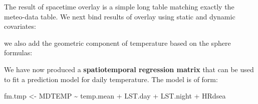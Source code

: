 \documentclass[
  graybox,natbib,nospthms]{svmono}
\newenvironment{Shaded}{\begin{snugshade}}{\end{snugshade}}
\newcommand{\AttributeTok}[1]{\textcolor[rgb]{0.61,0.61,0.61}{#1}}
\newcommand{\CommentTok}[1]{\textcolor[rgb]{0.37,0.37,0.37}{\textit{#1}}}
\newcommand{\FloatTok}[1]{\textcolor[rgb]{0.06,0.06,0.06}{#1}}
\newcommand{\FunctionTok}[1]{\textcolor[rgb]{0,0,0}{#1}}
\newcommand{\NormalTok}[1]{#1}
\newcommand{\OtherTok}[1]{\textcolor[rgb]{0.37,0.37,0.37}{#1}}
\newcommand{\SpecialCharTok}[1]{\textcolor[rgb]{0,0,0}{#1}}
\newcommand{\StringTok}[1]{\textcolor[rgb]{0.5,0.5,0.5}{#1}}
\begin{document}
The result of spacetime overlay is a simple long table matching exactly the meteo-data table.
We next bind results of overlay using static and dynamic covariates:

\begin{Shaded}
\end{Shaded}

we also add the geometric component of temperature based on the sphere formulas:

\begin{Shaded}
\end{Shaded}

We have now produced a \textbf{spatiotemporal regression matrix} that can be used to fit
a prediction model for daily temperature. The model is of form:

\begin{Shaded}
\begin{Highlighting}[]
\NormalTok{fm.tmp }\OtherTok{\textless{}{-}}\NormalTok{ MDTEMP }\SpecialCharTok{\textasciitilde{}}\NormalTok{ temp.mean }\SpecialCharTok{+}\NormalTok{ LST.day }\SpecialCharTok{+}\NormalTok{ LST.night }\SpecialCharTok{+}\NormalTok{ HRdsea}
\end{Highlighting}
\end{Shaded}
\end{document}
